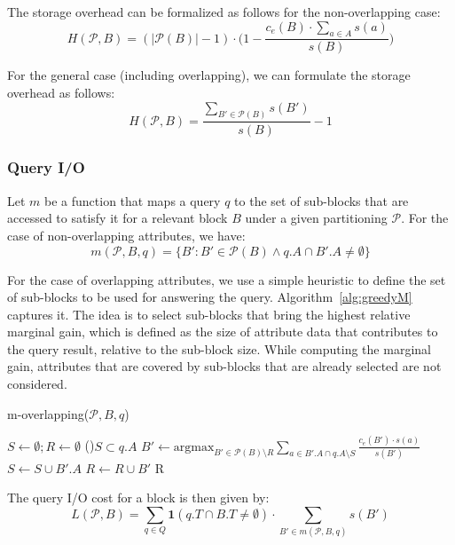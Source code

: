 The storage overhead can be formalized as follows for the non-overlapping case:
\begin{equation}
H(\mathcal{P}, B) = (|\mathcal{P}(B)|-1)\cdot\Big(1-\frac{c_e(B)\cdot \sum_{a\in A} s(a)}{s(B)}\Big) 
\end{equation}

For the general case (including overlapping), we can formulate the storage
overhead as follows:
\begin{equation}
H(\mathcal{P}, B) = \frac{\sum_{B'\in \mathcal{P}(B)} s(B')}{s(B)} - 1 
\end{equation}


\subsubsection{Query I/O}

Let $m$ be a function that maps a query $q$ to the set of sub-blocks that are
accessed to satisfy it for a relevant block $B$ under a given partitioning
$\mathcal{P}$. For the case of non-overlapping attributes, we have:
\begin{equation}
m(\mathcal{P}, B, q) = \{B': B'\in \mathcal{P}(B) \wedge q.A \cap B'.A \ne \emptyset\}  
\end{equation}

For the case of overlapping attributes, we use a simple heuristic to define the
set of sub-blocks to be used for answering the query.
Algorithm~\ref{alg:greedyM} captures it. The idea is to select sub-blocks that
bring the highest relative marginal gain, which is defined as the size of
attribute data that contributes to the query result, relative to the sub-block
size. While computing the marginal gain, attributes that are covered by
sub-blocks that are already selected are not considered.
%
\begin{algorithm}[ht]
\scriptsize
\caption{m-overlapping($\mathcal{P}, B, q$)}
\label{alg:greedyM}
$S\leftarrow \emptyset; R\leftarrow \emptyset$ 
\While(){$S \subset q.A$}{
  $B' \leftarrow \mbox{argmax}_{B'\in\mathcal{P}(B)\setminus R} \sum_{a\in B'.A \cap q.A \setminus S} \frac{c_e(B') \cdot s(a)}{s(B')}$
  $S \leftarrow S \cup B'.A$
  $R\leftarrow R \cup B'$
}
\Return R 
\end{algorithm} 
%
The query I/O cost for a block is then given by:
\begin{equation}
L(\mathcal{P}, B) = \sum_{q\in Q} \mathbf{1}(q.T \cap B.T \neq \emptyset) \cdot \sum_{B'\in m(\mathcal{P}, B, q)} \!\!s(B')
\end{equation}


